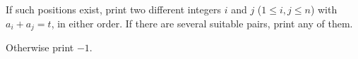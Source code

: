If such positions exist, print two different integers $i$ and $j$ ($1 \le i, j \le n$) with $a_i + a_j = t$, in either order. If there are several suitable pairs, print any of them.

Otherwise print $-1$.
